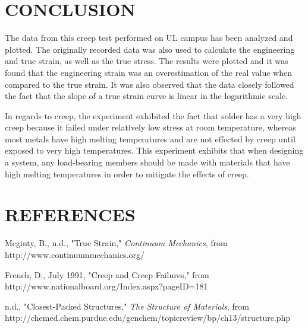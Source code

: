 \documentclass[12pt]{article}
\begin{document}
\newpage


\section*{\fontsize{12}{12}\selectfont CONCLUSION}
The data from this creep test performed on UL campus has been analyzed and plotted. The originally recorded data was also used to calculate the engineering and true strain, as well as the true stress. The results were plotted and it was found that the engineering strain was an overestimation of the real value when compared to the true strain. It was also observed that the data closely followed the fact that the slope of a true strain curve is linear in the logarithmic scale. 
\bigskip

In regards to creep, the experiment exhibited the fact that solder has a very high creep because it failed under relatively low stress at room temperature, whereas most metals have high melting temperatures and are not effected by creep until exposed to very high temperatures. This experiment exhibits that when designing a system, any load-bearing members should be made with materials that have high melting temperatures in order to mitigate the effects of creep.
\bigskip


\section*{\fontsize{12}{12}\selectfont REFERENCES}

\begin{thebibliography}{2}

Mcginty, B., n.d.,
"True Strain," \emph{Continuum Mechanics}, from
http://www.continuummechanics.org/

French, D., July 1991,
"Creep and Creep Failures," from
http://www.nationalboard.org/Index.aspx?pageID=181

n.d., "Closest-Packed Structures," \emph{The Structure of Materials}, from
http://chemed.chem.purdue.edu/genchem/topicreview/bp/ch13/structure.php

\end{thebibliography}


\end{document}
